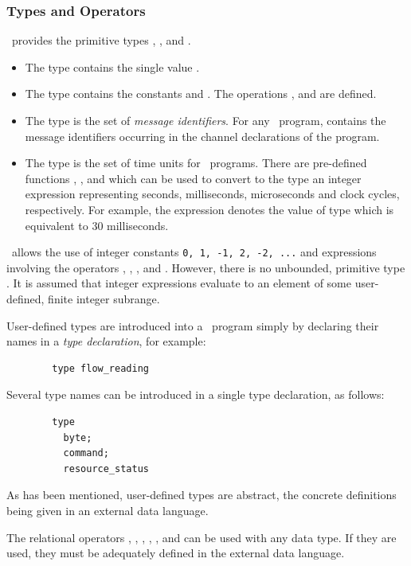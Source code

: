 \subsubsection{Types and Operators}
\candle\ provides the primitive types , ,
\trm{\canMsgId} and . 
\begin{itemize}
\item 
The  type contains the single value \trm{\unitval}.   
\item 
The  type contains the constants  and {\false}. 
The operations ,  and  are defined. 
\item
The \trm{\canMsgId} type is the set of \emph{message identifiers}. For
any \candle\ program, \trm{\canMsgId} contains the message identifiers
occurring in the channel declarations of the program.
\item The  type is the set of time units for \candle\ 
programs. There are pre-defined functions , ,
\trm{Usecs} and \trm{Cycles} which can be used to convert to the
\trm{duration} type an integer expression representing seconds, milliseconds, 
microseconds and clock cycles, respectively. For example, the
expression  denotes the value of type 
which is equivalent to 30 milliseconds.
\end{itemize}
\candle\ allows the use of integer constants
{\tt 0, 1, -1, 2, -2, ...} and expressions involving the operators
\trm{+}, \trm{-}, \trm{*}, \trm{/} and \trm{mod}.  However, there is no
unbounded, primitive type \trm{integer}. It is assumed that integer
expressions evaluate to an element of some user-defined, finite
integer subrange. 

User-defined types are introduced into a \candle\ program simply by
declaring their names in a \emph{type declaration}, for example:
\begin{verbatim}
        type flow_reading
\end{verbatim}
Several type names can be introduced in a single type declaration, as
follows:
\begin{verbatim}
        type 
          byte;
          command; 
          resource_status  
\end{verbatim}
As has been mentioned, user-defined types are abstract, the concrete
definitions being given in an external data language.

The relational operators \trm{=}, \trm{/=}, \trm{<}, \trm{<=}, \trm{>=},
and \trm{>} can be used with any data type. If they are used, they must
be adequately defined in the external data language.

